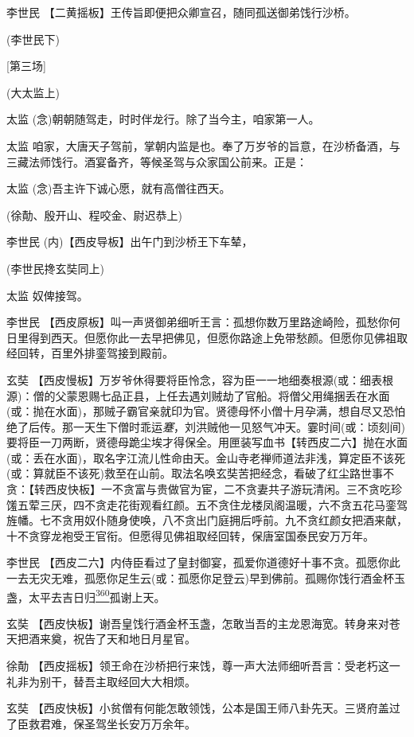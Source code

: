 李世民 【二黄摇板】王传旨即便把众卿宣召，随同孤送御弟饯行沙桥。

(李世民下)

{[}第三场{]}

(大太监上)

太监 (念)朝朝随驾走，时时伴龙行。除了当今主，咱家第一人。

太监
咱家，大唐天子驾前，掌朝内监是也。奉了万岁爷的旨意，在沙桥备酒，与三藏法师饯行。酒宴备齐，等候圣驾与众家国公前来。正是：

太监 (念)吾主许下诚心愿，就有高僧往西天。

(徐勣、殷开山、程咬金、尉迟恭上)

李世民 (内)【西皮导板】出午门到沙桥王下车辇，

(李世民搀玄奘同上)

太监 奴俾接驾。

李世民
【西皮原板】叫一声贤御弟细听王言：孤想你数万里路途崎险，孤愁你何日里得到西天。但愿你此一去早把佛见，但愿你路途上免带愁颜。但愿你见佛祖取经回转，百里外排銮驾接到殿前。

玄奘
【西皮慢板】万岁爷休得要将臣怜念，容为臣一一地细奏根源(或：细表根源)：僧的父蒙恩赐七品正县，上任去遇刘贼劫了官船。将僧父用绳捆丢在水面(或：抛在水面)，那贼子霸官亲就印为官。贤德母怀小僧十月孕满，想自尽又恐怕绝了后传。那一天生下僧时乖运\emph{蹇}，刘洪贼他一见怒气冲天。霎时间(或：顷刻间)要将臣一刀两断，贤德母跪尘埃才得保全。用匣装写血书【转西皮二六】抛在水面(或：丢在水面)，取名字江流儿性命由天。金山寺老禅师道法非浅，算定臣不该死(或：算就臣不该死)救至在山前。取法名唤玄奘苦把经念，看破了红尘路世事不贪：【转西皮快板】一不贪富与贵做官为宦，二不贪妻共子游玩清闲。三不贪吃珍馐五荤三厌，四不贪走花街观看红颜。五不贪住龙楼凤阁温暖，六不贪五花马銮驾旌幡。七不贪用奴仆随身使唤，八不贪出门庭拥后呼前。九不贪红颜女把酒来献，十不贪穿龙袍受王官衔。但愿得见佛祖取经回转，保唐室国泰民安万万年。

李世民
【西皮二六】内侍臣看过了皇封御宴，孤爱你道德好十事不贪。孤愿你此一去无灾无难，孤愿你足生云(或：孤愿你足登云)早到佛前。孤赐你饯行酒金杯玉盏，太平去吉日归\protect\hyperlink{fn360}{\textsuperscript{360}}孤谢上天。

玄奘
【西皮快板】谢吾皇饯行酒金杯玉盏，怎敢当吾的主龙恩海宽。转身来对苍天把酒来奠，祝告了天和地日月星官。

徐勣
【西皮摇板】领王命在沙桥把行来饯，尊一声大法师细听吾言：受老朽这一礼非为别干，替吾主取经回大大相烦。

玄奘
【西皮快板】小贫僧有何能怎敢领饯，公本是国王师八卦先天。三贤府盖过了臣救君难，保圣驾坐长安万万余年。

